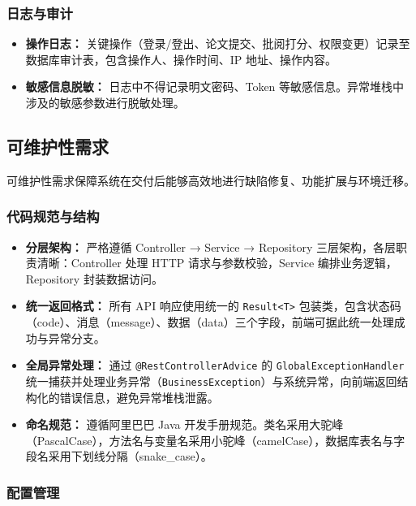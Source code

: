 \documentclass{../../softeng}
\begin{document}
{\subsubsection{日志与审计}

\begin{itemize}
    \item \textbf{操作日志：} 关键操作（登录/登出、论文提交、批阅打分、权限变更）记录至数据库审计表，包含操作人、操作时间、IP 地址、操作内容。
    \item \textbf{敏感信息脱敏：} 日志中不得记录明文密码、Token 等敏感信息。异常堆栈中涉及的敏感参数进行脱敏处理。
\end{itemize}

\subsection{可维护性需求}

可维护性需求保障系统在交付后能够高效地进行缺陷修复、功能扩展与环境迁移。

\subsubsection{代码规范与结构}

\begin{itemize}
    \item \textbf{分层架构：} 严格遵循 Controller → Service → Repository 三层架构，各层职责清晰：Controller 处理 HTTP 请求与参数校验，Service 编排业务逻辑，Repository 封装数据访问。
    \item \textbf{统一返回格式：} 所有 API 响应使用统一的 \texttt{Result<T>} 包装类，包含状态码（code）、消息（message）、数据（data）三个字段，前端可据此统一处理成功与异常分支。
    \item \textbf{全局异常处理：} 通过 \texttt{@RestControllerAdvice} 的 \texttt{GlobalExceptionHandler} 统一捕获并处理业务异常（\texttt{BusinessException}）与系统异常，向前端返回结构化的错误信息，避免异常堆栈泄露。
    \item \textbf{命名规范：} 遵循阿里巴巴 Java 开发手册规范。类名采用大驼峰（PascalCase），方法名与变量名采用小驼峰（camelCase），数据库表名与字段名采用下划线分隔（snake\_case）。
\end{itemize}

\subsubsection{配置管理}

}
\end{document}
